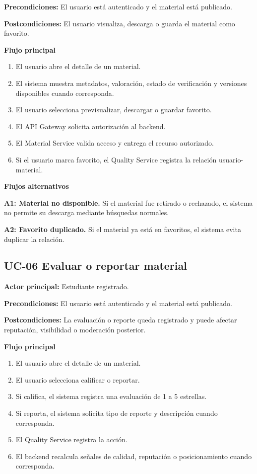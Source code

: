 \documentclass[12pt,a4paper]{article}
\begin{document}
\noindent\textbf{Precondiciones:} El usuario está autenticado y el material está publicado.

\noindent\textbf{Postcondiciones:} El usuario visualiza, descarga o guarda el material como favorito.

\noindent\textbf{Flujo principal}

\begin{enumerate}
    \item El usuario abre el detalle de un material.
    \item El sistema muestra metadatos, valoración, estado de verificación y versiones disponibles cuando corresponda.
    \item El usuario selecciona previsualizar, descargar o guardar favorito.
    \item El API Gateway solicita autorización al backend.
    \item El Material Service valida acceso y entrega el recurso autorizado.
    \item Si el usuario marca favorito, el Quality Service registra la relación usuario-material.
\end{enumerate}

\noindent\textbf{Flujos alternativos}

\noindent\textbf{A1: Material no disponible.} Si el material fue retirado o rechazado, el sistema no permite su descarga mediante búsquedas normales.

\noindent\textbf{A2: Favorito duplicado.} Si el material ya está en favoritos, el sistema evita duplicar la relación.

\subsection{UC-06 Evaluar o reportar material}

\noindent\textbf{Actor principal:} Estudiante registrado.

\noindent\textbf{Precondiciones:} El usuario está autenticado y el material está publicado.

\noindent\textbf{Postcondiciones:} La evaluación o reporte queda registrado y puede afectar reputación, visibilidad o moderación posterior.

\noindent\textbf{Flujo principal}

\begin{enumerate}
    \item El usuario abre el detalle de un material.
    \item El usuario selecciona calificar o reportar.
    \item Si califica, el sistema registra una evaluación de 1 a 5 estrellas.
    \item Si reporta, el sistema solicita tipo de reporte y descripción cuando corresponda.
    \item El Quality Service registra la acción.
    \item El backend recalcula señales de calidad, reputación o posicionamiento cuando corresponda.
\end{enumerate}
\end{document}
